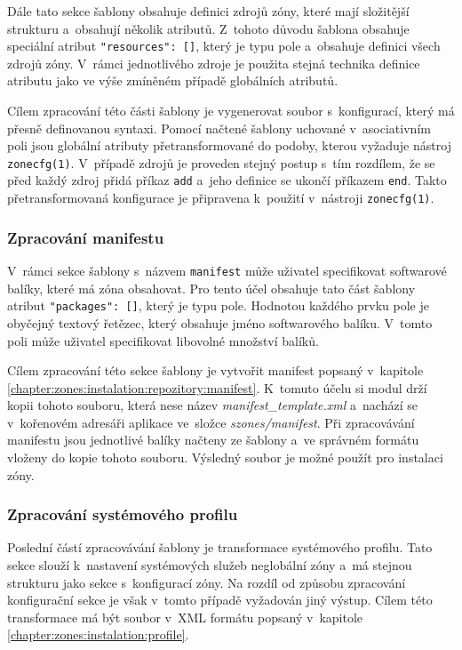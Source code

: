 Dále tato sekce šablony obsahuje definici zdrojů zóny, které mají složitější strukturu a~obsahují několik atributů. Z~tohoto
důvodu šablona obsahuje speciální atribut \texttt{{"resources": []}}, který je typu pole a~obsahuje definici
všech zdrojů zóny. V~rámci jednotlivého zdroje je použita stejná technika definice atributu jako ve výše zmíněném případě
globálních atributů.

Cílem zpracování této části šablony je vygenerovat soubor s~konfigurací, který má přesně definovanou syntaxi. Pomocí načtené
šablony uchované v~asociativním poli jsou globální atributy přetransformované do podoby, kterou vyžaduje nástroj \verb|zonecfg(1)|.
V~případě zdrojů je proveden stejný postup s~tím rozdílem, že se před každý zdroj přidá příkaz \verb|add| a~jeho definice
se ukončí příkazem \verb|end|. Takto přetransformovaná konfigurace je připravena k~použití v~nástroji \verb|zonecfg(1)|.
\subsubsection{Zpracování manifestu}
\label{chapter:implementation:szones:template:manifest}
V~rámci sekce šablony s~názvem \texttt{manifest} může uživatel specifikovat softwarové balíky, které má zóna obsahovat.
Pro tento účel obsahuje tato část šablony atribut \texttt{{"packages": []}}, který je typu pole. Hodnotou každého
prvku pole je obyčejný textový řetězec, který obsahuje jméno softwarového balíku. V~tomto poli může uživatel specifikovat libovolné
množství balíků. 

Cílem zpracování této sekce šablony je vytvořit manifest popsaný v~kapitole \ref{chapter:zones:instalation:repozitory:manifest}.
K~tomuto účelu si modul drží kopii tohoto souboru, která nese název \textit{manifest\_template.xml} a~nachází se v~kořenovém 
adresáři aplikace ve~složce \textit{szones/manifest}. Při zpracovávání manifestu jsou jednotlivé balíky načteny ze šablony
a~ve správném formátu vloženy do kopie tohoto souboru. Výsledný soubor je možné použít pro instalaci zóny.
\subsubsection{Zpracování systémového profilu}
\label{chapter:implementation:szones:template:profile}
Poslední částí zpracovávání šablony je transformace systémového profilu. Tato sekce slouží k~nastavení systémových služeb
neglobální zóny a~má stejnou strukturu jako sekce s~konfigurací zóny. Na rozdíl od způsobu zpracování konfigurační sekce je
však v~tomto případě vyžadován jiný výstup. Cílem této transformace má být soubor v~XML formátu popsaný v~kapitole \ref{chapter:zones:instalation:profile}.


